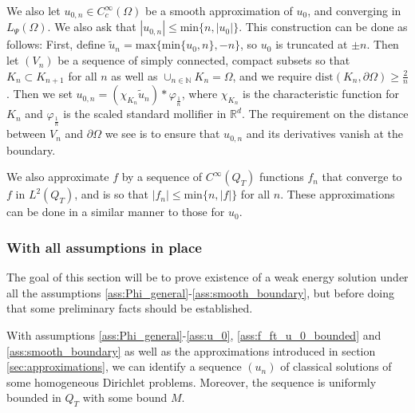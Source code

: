 \documentclass[11pt, a4paper]{article}
\begin{document}
We also let $u_{0,n}\in C^\infty_c(\Omega)$ be a smooth approximation of $u_0$, and converging in $L_\Psi(\Omega)$. We also ask that $|u_{0,n}| \leq \mathrm{min}\{n,|u_0|\}$.
This construction can be done as follows: First, define $\tilde{u}_n = \mathrm{max}\{ \mathrm{min}\{u_0, n\}, -n\}$, so $u_0$ is truncated at $\pm n$. Then let $(V_n)$ be a sequence of simply connected, compact subsets so that $K_n \subset K_{n+1}$ for all $n$ as well as $\cup_{n\in \mathbb{N}}K_n = \Omega$, and we require $\mathrm{dist}(K_n,\partial \Omega) \geq \frac{2}{n}$. Then we set $u_{0,n}= (\chi_{K_n}\tilde{u}_n)*\varphi_{\frac{1}{n}}$, where $\chi_{K_n}$ is the characteristic function for $K_n$ and $\varphi_{\frac{1}{n}}$ is the scaled standard mollifier in $\mathbb{R}^d$. The requirement on the distance between $V_n$ and $\partial \Omega$ we see is to ensure that $u_{0,n}$ and its derivatives vanish at the boundary. 

We also approximate $f$ by a sequence of $C^\infty(Q_T)$ functions $f_n$ that converge to $f$ in $L^2(Q_T)$, and is so that $|f_n| \leq \mathrm{min}\{n,|f|\}$ for all $n$. These approximations can be done in a similar manner to those for $u_0$.

\subsubsection{With all assumptions in place}
The goal of this section will be to prove existence of a weak energy solution under all the assumptions \ref{ass:Phi_general}-\ref{ass:smooth_boundary}, but before doing that some preliminary facts should be established.

\begin{proposition}
\label{prop:classical_sols_seq}
With assumptions \ref{ass:Phi_general}-\ref{ass:u_0}, \ref{ass:f_ft_u_0_bounded} and \ref{ass:smooth_boundary} as well as the approximations introduced in section \ref{sec:approximations}, we can identify a sequence $(u_n)$ of classical solutions of some homogeneous Dirichlet problems. Moreover, the sequence is uniformly bounded in $Q_T$ with some bound $M$.
\end{proposition}
\end{document}
